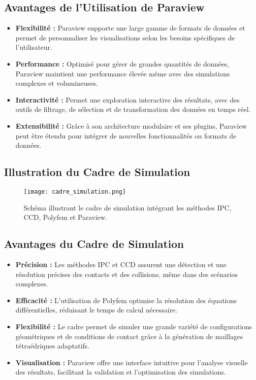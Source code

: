 \subsection{Avantages de l'Utilisation de Paraview}

\begin{itemize}
    \item \textbf{Flexibilité :}  
    Paraview supporte une large gamme de formats de données et permet de personnaliser les visualisations selon les besoins spécifiques de l'utilisateur.
    
    \item \textbf{Performance :}  
    Optimisé pour gérer de grandes quantités de données, Paraview maintient une performance élevée même avec des simulations complexes et volumineuses.
    
    \item \textbf{Interactivité :}  
    Permet une exploration interactive des résultats, avec des outils de filtrage, de sélection et de transformation des données en temps réel.
    
    \item \textbf{Extensibilité :}  
    Grâce à son architecture modulaire et ses plugins, Paraview peut être étendu pour intégrer de nouvelles fonctionnalités ou formats de données.
\end{itemize}

\subsection{Illustration du Cadre de Simulation}

\begin{figure}[h]
    \centering
    \texttt{[image: cadre\_simulation.png]}
    \caption{Schéma illustrant le cadre de simulation intégrant les méthodes IPC, CCD, Polyfem et Paraview.}
    \label{fig:cadre_simulation}
\end{figure}

\subsection{Avantages du Cadre de Simulation}

\begin{itemize}
    \item \textbf{Précision :} Les méthodes IPC et CCD assurent une détection et une résolution précises des contacts et des collisions, même dans des scénarios complexes.
    \item \textbf{Efficacité :} L'utilisation de Polyfem optimise la résolution des équations différentielles, réduisant le temps de calcul nécessaire.
    \item \textbf{Flexibilité :} Le cadre permet de simuler une grande variété de configurations géométriques et de conditions de contact grâce à la génération de maillages tétraédriques adaptatifs.
    \item \textbf{Visualisation :} Paraview offre une interface intuitive pour l'analyse visuelle des résultats, facilitant la validation et l'optimisation des simulations.
\end{itemize}

